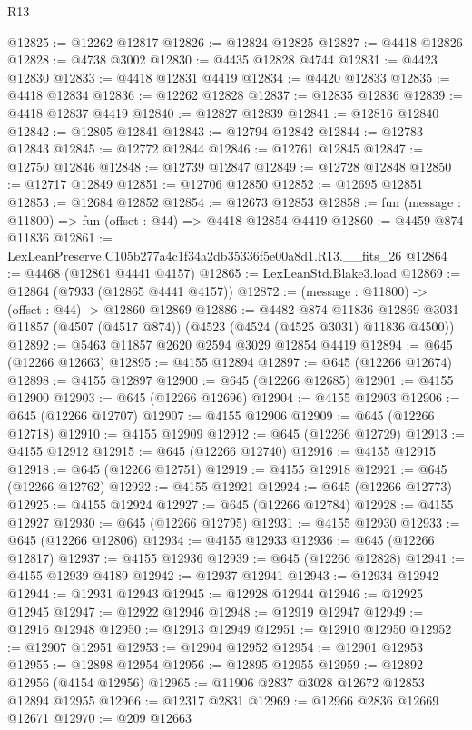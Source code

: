 \begin{lexlean}{R13}
\begin{coremodule}
@12825 := @12262 @12817
@12826 := @12824 @12825
@12827 := @4418 @12826
@12828 := @4738 @3002
@12830 := @4435 @12828 @4744
@12831 := @4423 @12830
@12833 := @4418 @12831 @4419
@12834 := @4420 @12833
@12835 := @4418 @12834
@12836 := @12262 @12828
@12837 := @12835 @12836
@12839 := @4418 @12837 @4419
@12840 := @12827 @12839
@12841 := @12816 @12840
@12842 := @12805 @12841
@12843 := @12794 @12842
@12844 := @12783 @12843
@12845 := @12772 @12844
@12846 := @12761 @12845
@12847 := @12750 @12846
@12848 := @12739 @12847
@12849 := @12728 @12848
@12850 := @12717 @12849
@12851 := @12706 @12850
@12852 := @12695 @12851
@12853 := @12684 @12852
@12854 := @12673 @12853
@12858 := fun (message : @11800) => fun (offset : @44) => @4418 @12854 @4419
@12860 := @4459 @874 @11836
@12861 := LexLeanPreserve.C105b277a4c1f34a2db35336f5e00a8d1.R13.__fits_26
@12864 := @4468 (@12861 @4441 @4157)
@12865 := LexLeanStd.Blake3.load
@12869 := @12864 (@7933 (@12865 @4441 @4157))
@12872 := (message : @11800) -> (offset : @44) -> @12860 @12869
@12886 := @4482
    @874
    @11836
    @12869
    @3031
    @11857
    (@4507 (@4517 @874))
    (@4523 (@4524 (@4525 @3031) @11836 @4500))
@12892 := @5463 @11857 @2620 @2594 @3029 @12854 @4419
@12894 := @645 (@12266 @12663)
@12895 := @4155 @12894
@12897 := @645 (@12266 @12674)
@12898 := @4155 @12897
@12900 := @645 (@12266 @12685)
@12901 := @4155 @12900
@12903 := @645 (@12266 @12696)
@12904 := @4155 @12903
@12906 := @645 (@12266 @12707)
@12907 := @4155 @12906
@12909 := @645 (@12266 @12718)
@12910 := @4155 @12909
@12912 := @645 (@12266 @12729)
@12913 := @4155 @12912
@12915 := @645 (@12266 @12740)
@12916 := @4155 @12915
@12918 := @645 (@12266 @12751)
@12919 := @4155 @12918
@12921 := @645 (@12266 @12762)
@12922 := @4155 @12921
@12924 := @645 (@12266 @12773)
@12925 := @4155 @12924
@12927 := @645 (@12266 @12784)
@12928 := @4155 @12927
@12930 := @645 (@12266 @12795)
@12931 := @4155 @12930
@12933 := @645 (@12266 @12806)
@12934 := @4155 @12933
@12936 := @645 (@12266 @12817)
@12937 := @4155 @12936
@12939 := @645 (@12266 @12828)
@12941 := @4155 @12939 @4189
@12942 := @12937 @12941
@12943 := @12934 @12942
@12944 := @12931 @12943
@12945 := @12928 @12944
@12946 := @12925 @12945
@12947 := @12922 @12946
@12948 := @12919 @12947
@12949 := @12916 @12948
@12950 := @12913 @12949
@12951 := @12910 @12950
@12952 := @12907 @12951
@12953 := @12904 @12952
@12954 := @12901 @12953
@12955 := @12898 @12954
@12956 := @12895 @12955
@12959 := @12892 @12956 (@4154 @12956)
@12965 := @11906 @2837 @3028 @12672 @12853 @12894 @12955
@12966 := @12317 @2831
@12969 := @12966 @2836 @12669 @12671
@12970 := @209 @12663

\end{coremodule}
\end{lexlean}
